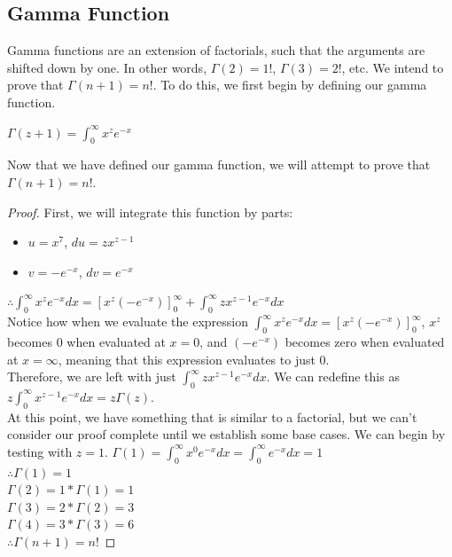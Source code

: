 \subsection{Gamma Function}
Gamma functions are an extension of factorials, such that the arguments are shifted down by one. In other words, $\Gamma(2) = 1!$, $\Gamma(3) = 2!$, etc. We intend to prove that $\Gamma(n+1) = n!$. To do this, we first begin by defining our gamma function.\\
\begin{definition}
    $\Gamma(z+1)=\int_{0}^{\infty} {x^{z}e^{-x}}$
\end{definition}
Now that we have defined our gamma function, we will attempt to prove that $\Gamma(n+1) = n!$.\\
\begin{proof}
First, we will integrate this function by parts:
\begin{multicols}{2}
\begin{itemize}
    \item $u = x^7$, $du = zx^{z-1}$
    \item $v = -e^{-x}$, $dv=e^{-x}$
\end{itemize}
\end{multicols}
$\therefore \int_{0}^{\infty}{x^{z}e^{-x}dx} = [x^{z}(-e^{-x})]_{0}^{\infty} + \int_{0}^{\infty}{zx^{z-1}e^{-x}dx}$\\

Notice how when we evaluate the expression $\int_{0}^{\infty}{x^{z}e^{-x}dx} = [x^{z}(-e^{-x})]_{0}^{\infty}$, $x^{z}$ becomes $0$ when evaluated at $x=0$, and $(-e^{-x})$ becomes zero when evaluated at $x=\infty$, meaning that this expression evaluates to just $0$. \\

Therefore, we are left with just $\int_{0}^{\infty}{zx^{z-1}e^{-x}dx}$. We can redefine this as $z\int_{0}^{\infty}{x^{z-1}e^{-x}dx} = z\Gamma(z)$.\\

At this point, we have something that is similar to a factorial, but we can't consider our proof complete until we establish some base cases. We can begin by testing with $z=1$. $\Gamma(1) = \int_{0}^{\infty}{x^{0}e^{-x}}dx = \int_{0}^{\infty}{e^{-x}}dx = 1$\\
$\therefore \Gamma(1) = 1$\\
$\Gamma(2) = 1 * \Gamma(1) = 1$\\
$\Gamma(3) = 2 * \Gamma(2) = 3$\\
$\Gamma(4) = 3 * \Gamma(3) = 6$\\
$\therefore \Gamma(n+1) = n!$
\end{proof}
